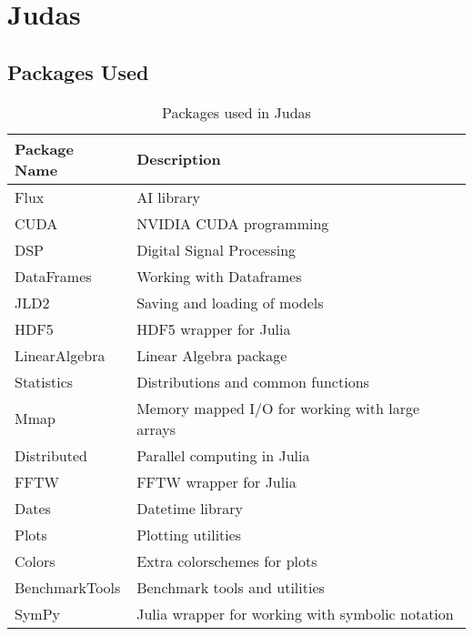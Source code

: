 \chapter{Judas}
\label{app:judas}


\section{Packages Used}
\label{app:jupacks}

\begin{table}[!h]
\centering
\caption{Packages used in Judas}
\label{tab:judas-packages}
\small
\begin{tabular}{>{\raggedright\arraybackslash}p{}>{\raggedright\arraybackslash}p{}}
\toprule
\textbf{Package Name} & \textbf{Description} \\
\midrule
\rowcolor{gray!10} Flux & AI library \\
CUDA & NVIDIA CUDA programming \\
\rowcolor{gray!10} DSP & Digital Signal Processing \\
DataFrames & Working with Dataframes \\
\rowcolor{gray!10} JLD2 & Saving and loading of models \\
HDF5 & HDF5 wrapper for Julia \\
\rowcolor{gray!10} LinearAlgebra & Linear Algebra package \\
Statistics & Distributions and common functions \\
\rowcolor{gray!10} Mmap & Memory mapped I/O for working with large arrays \\
Distributed & Parallel computing in Julia \\
\rowcolor{gray!10} FFTW & FFTW wrapper for Julia \\
Dates & Datetime library \\
\rowcolor{gray!10} Plots & Plotting utilities \\
Colors & Extra colorschemes for plots \\
\rowcolor{gray!10} BenchmarkTools & Benchmark tools and utilities \\
SymPy & Julia wrapper for working with symbolic notation \\
\bottomrule
\end{tabular}
\end{table}